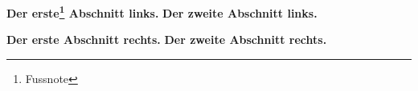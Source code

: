 \documentclass{article}
\begin{document}
\begin{pages}
\numberlinefalse
\begin{Leftside}
\beginnumbering
\pstart
\textbf{Der erste\footnote{Fussnote} Abschnitt links.} \blindtext[2]
\pend
\pstart
\textbf{Der zweite Abschnitt links.} \blindtext
\pend
\end{Leftside}
\begin{Rightside}
\beginnumbering
\pstart
\textbf{Der erste Abschnitt rechts.} \blindtext
\pend
\pstart
\textbf{Der zweite Abschnitt rechts.} \blindtext
\pend
\endnumbering
\end{Rightside}
\Pages
\end{pages}
\end{document}
